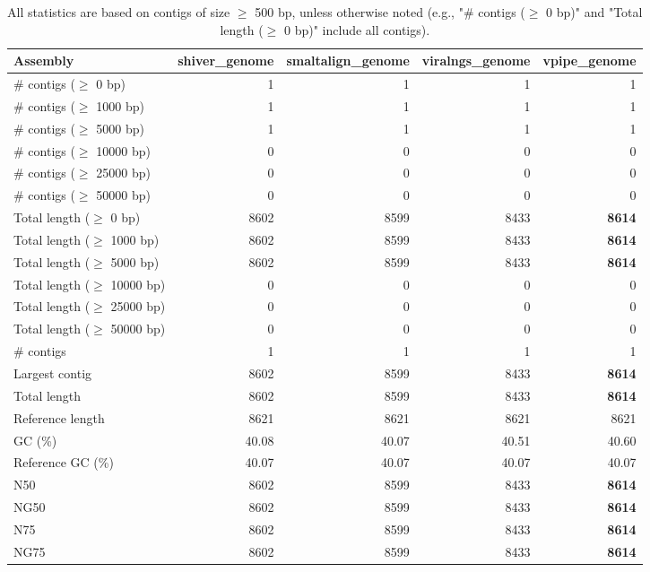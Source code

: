 \documentclass[12pt,a4paper]{article}
\begin{document}
\begin{table}[ht]
\begin{center}
\caption{All statistics are based on contigs of size $\geq$ 500 bp, unless otherwise noted (e.g., "\# contigs ($\geq$ 0 bp)" and "Total length ($\geq$ 0 bp)" include all contigs).}
\begin{tabular}{|l*{4}{|r}|}
\hline
Assembly & shiver\_genome & smaltalign\_genome & viralngs\_genome & vpipe\_genome \\ \hline
\# contigs ($\geq$ 0 bp) & 1 & 1 & 1 & 1 \\ \hline
\# contigs ($\geq$ 1000 bp) & 1 & 1 & 1 & 1 \\ \hline
\# contigs ($\geq$ 5000 bp) & 1 & 1 & 1 & 1 \\ \hline
\# contigs ($\geq$ 10000 bp) & 0 & 0 & 0 & 0 \\ \hline
\# contigs ($\geq$ 25000 bp) & 0 & 0 & 0 & 0 \\ \hline
\# contigs ($\geq$ 50000 bp) & 0 & 0 & 0 & 0 \\ \hline
Total length ($\geq$ 0 bp) & 8602 & 8599 & 8433 & {\bf 8614} \\ \hline
Total length ($\geq$ 1000 bp) & 8602 & 8599 & 8433 & {\bf 8614} \\ \hline
Total length ($\geq$ 5000 bp) & 8602 & 8599 & 8433 & {\bf 8614} \\ \hline
Total length ($\geq$ 10000 bp) & 0 & 0 & 0 & 0 \\ \hline
Total length ($\geq$ 25000 bp) & 0 & 0 & 0 & 0 \\ \hline
Total length ($\geq$ 50000 bp) & 0 & 0 & 0 & 0 \\ \hline
\# contigs & 1 & 1 & 1 & 1 \\ \hline
Largest contig & 8602 & 8599 & 8433 & {\bf 8614} \\ \hline
Total length & 8602 & 8599 & 8433 & {\bf 8614} \\ \hline
Reference length & 8621 & 8621 & 8621 & 8621 \\ \hline
GC (\%) & 40.08 & 40.07 & 40.51 & 40.60 \\ \hline
Reference GC (\%) & 40.07 & 40.07 & 40.07 & 40.07 \\ \hline
N50 & 8602 & 8599 & 8433 & {\bf 8614} \\ \hline
NG50 & 8602 & 8599 & 8433 & {\bf 8614} \\ \hline
N75 & 8602 & 8599 & 8433 & {\bf 8614} \\ \hline
NG75 & 8602 & 8599 & 8433 & {\bf 8614} \\ \hline

\end{tabular}
\end{center}
\end{table}
\end{document}
